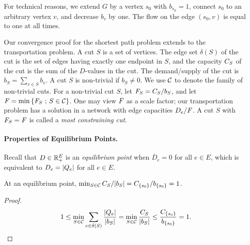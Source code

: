 \documentclass[11pt,a4paper]{article}
\newcommand{\Real}{\R}
\renewcommand{\source}{\ensuremath{s_0}}
\begin{document}
For technical reasons, we extend $G$ by a vertex $\source$ with $b_{\source} =
1$, connect $\source$ to an arbitrary vertex $v$, and decrease $b_v$ by
one. The flow on the edge $(\source, v)$ is equal to one at all times. 

Our convergence proof for the shortest path problem extends to the
transportation problem. 
A cut $S$ is a set of vertices. The edge set
$\delta(S)$ of the cut is the set of edges having exactly one endpoint in $S$,
and the capacity $\capa(S)$ of the cut is the sum of the $D$-values in the
cut. The demand/supply of the cut is $b_S = \sum_{v \in S} b_v$. A cut $S$ is 
non-trivial if $b_S \not= 0$. We use ${\cal C}$ to denote the family of
non-trivial cuts. For a non-trivial cut $S$, let $\mathit{F}_S = C_S/b_S$, and 
let $\mathit{F} = \min \left\{ \mathit{F}_S \mbox{ ; } S \in {\cal C} \right\}$. One may
view $\mathit{F}$ as a scale factor; our transportation problem has a solution in a
network with edge capacities $D_e/\mathit{F}$. 
A cut $S$ with $\mathit{F}_S  = \mathit{F}$ is called a \emph{most constraining
cut}. 

\paragraph{Properties of Equilibrium Points.}
Recall that $D \in \Real_+^E$ is an \emph{equilibrium point} when $\dot{D_e}=0$ for all $e \in E$, which is equivalent to $D_e = | Q_e |$ for all $e \in E$.  

\begin{lemma}
\label{lem:equilibrium-mincut-trasport}
At an equilibrium point, $\min_{S \in \calC} \capa(S)/\abs{b_S} = \capa(\{s_0\})/b_{\{s_0\}} = 1$.
\end{lemma}
\begin{proof} \[ 1 \le \min_{S \in \calC} \sum_{e \in \delta(S)} \frac{\abs{Q_e}}{\abs{b_S}} =
\min_{S \in \calC} \frac{\capa(S)}{\abs{b_S}} \le \frac{\capa(\{s_0\})}{b_{\{s_0\}}} = 1. \]
\Lnegskip\end{proof}
\end{document}
